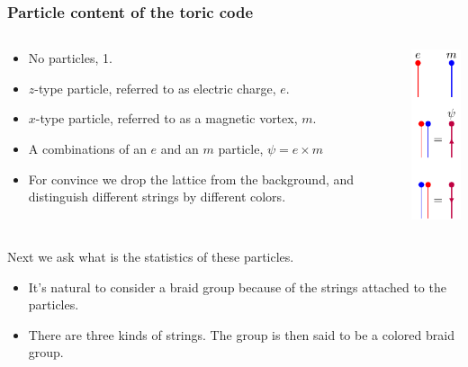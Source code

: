 \documentclass{beamer}
\renewcommand{\(}{\left(}
\renewcommand{\)}{\right)}
\renewcommand{\[}{\left[}
\renewcommand{\]}{\right]}
\begin{document}
\begin{frame}
    \frametitle{Particle content of the toric code}
    \begin{columns}
        \begin{column}{0.85\textwidth}
            \begin{itemize}
                \item No particles, 1.
                \item $z$-type particle, referred to as electric charge, $e$.
                \item $x$-type particle, referred to as a magnetic vortex, $m$.
                \item A combinations of an $e$ and an $m$ particle, $\psi = e \times m$
                \item For convince we drop the lattice from the background, and distinguish different strings by different colors.
            \end{itemize}
        \end{column}
    \begin{column}{0.15\textwidth}
        \centering
        \includegraphics[scale=1]{kinds_of_particles.pdf}
    \end{column}
    \end{columns}
    \pause
    \vspace{10pt}
    Next we ask what is the statistics of these particles. 

    \begin{itemize}
        \item It's natural to consider a braid group because of the strings attached to the particles.
        \item There are three kinds of strings. The group is then said to be a colored braid group. 
    \end{itemize}    
\end{frame}
\end{document}
